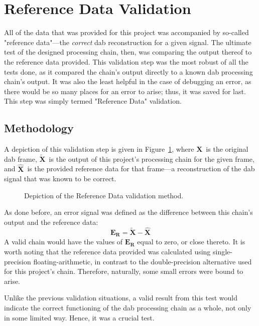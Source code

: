 \documentclass[class=report,11pt,crop=false]{standalone}
\begin{document}
\section{Reference Data Validation}
All of the data that was provided for this project was accompanied by so-called "reference data"---the \emph{correct} \gls{dab} reconstruction for a given signal. The ultimate test of the designed processing chain, then, was comparing the output thereof to the reference data provided. This validation step was the most robust of all the tests done, as it compared the chain's output directly to a known \gls{dab} processing chain's output. It was also the least helpful in the case of debugging an error, as there would be so many places for an error to arise; thus, it was saved for last.  This step was simply termed "Reference Data" validation.

\subsection{Methodology}
A depiction of this validation step is given in Figure~\ref{fig:reference-data-validation}, where \(\mathbf{X}\)~is the original \gls{dab} frame, \(\mathbf{\tilde{X}}\)~is the output of this project's processing chain for the given frame, and \(\mathbf{\hat{X}}\)~is the provided reference data for that frame---a reconstruction of the \gls{dab} signal that was known to be correct.

\begin{figure}[htbp]
  \centering
  \captionsetup{type=figure}
  \def\svgwidth{\linewidth}
  { %
      }
  \caption{Depiction of the Reference Data validation method.}
  \label{fig:reference-data-validation}
\end{figure}

As done before, an error signal was defined as the difference between this chain's output and the reference data:
\begin{equation}
  \mathbf{E_R} = \mathbf{\tilde{X}} - \mathbf{\hat{X}}
\end{equation}
A valid chain would have the values of \(\mathbf{E_R}\) equal to zero, or close thereto. It is worth noting that the reference data provided was calculated using single-precision floating-arithmetic, in contrast to the double-precision alternative used for this project's chain. Therefore, naturally, some small errors were bound to arise.

Unlike the previous validation situations, a valid result from this test would indicate the correct functioning of the \gls{dab} processing chain as a whole, not only in some limited way. Hence, it was a crucial test.
\end{document}

